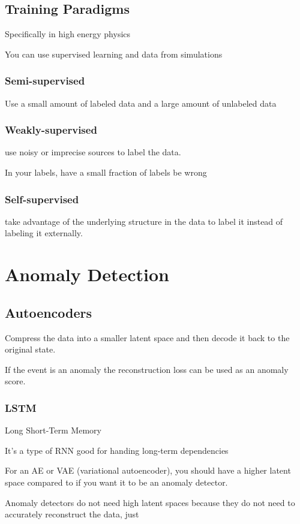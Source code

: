 \documentclass[fleqn]{report}
\begin{document}
\section{Training Paradigms}
Specifically in high energy physics 

You can use supervised learning and data from simulations

\subsection{Semi-supervised}
Use a small amount of labeled data and a large amount 
of unlabeled data 

\subsection{Weakly-supervised}
use noisy or imprecise sources to label the data.

In your labels, have a small fraction of labels be wrong 


\subsection{Self-supervised}
take advantage of the underlying structure in the data to label it instead 
of labeling it externally.

\chapter{Anomaly Detection}

\section{Autoencoders}
Compress the data into a smaller latent space and then decode it back 
to the original state. 

If the event is an anomaly the reconstruction loss can be used as an anomaly 
score. 

\subsection{LSTM}
Long Short-Term Memory 

It's a type of RNN good for handing long-term dependencies

For an AE or VAE (variational autoencoder), you should have a higher 
latent space compared to if you want it to be an anomaly detector. 

Anomaly detectors do not need high latent spaces because they do 
not need to accurately reconstruct the data, just 
\end{document}
